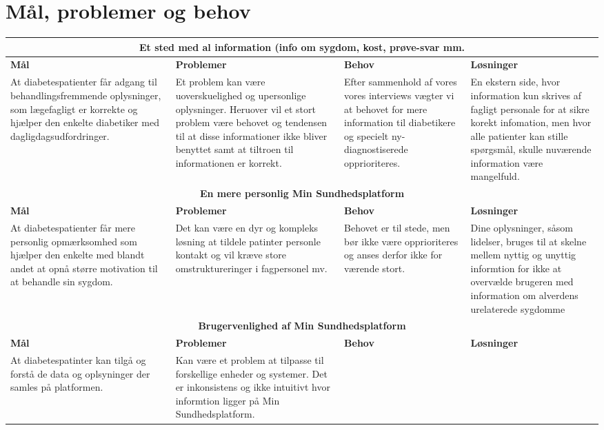 \section{Mål, problemer og behov}
\begin{tabularx}{\textwidth}{|X|X|X|X|}
	\hline
	\multicolumn{4}{|c|}{\textbf{Et sted med al information (info om sygdom, kost, prøve-svar mm.}}\\
	\hline
	\textbf{Mål} & \textbf{Problemer} & \textbf{Behov} & \textbf{Løsninger}\\
	\hline
	At diabetespatienter får adgang til behandlingsfremmende oplysninger, som lægefagligt er korrekte og hjælper den enkelte diabetiker med dagligdagsudfordringer.&
	Et problem kan være uoverskuelighed og upersonlige oplysninger. Heruover vil et stort problem være behovet og tendensen til at disse informationer ikke bliver benyttet samt at tiltroen til informationen er korrekt.&
	Efter sammenhold af vores vores interviews vægter vi at behovet for mere information til diabetikere og specielt ny-diagnostiserede opprioriteres.&
	En ekstern side, hvor information kun skrives af fagligt personale for at sikre korekt infomation, men hvor alle patienter kan stille spørgsmål, skulle nuværende information være mangelfuld.\\
	\hline
	\multicolumn{4}{|c|}{\textbf{En mere personlig Min Sundhedsplatform}}\\
	\hline
	\textbf{Mål} & \textbf{Problemer} & \textbf{Behov} & \textbf{Løsninger}\\
	\hline
	At diabetespatienter får mere personlig opmærksomhed som hjælper den enkelte med blandt andet at opnå større motivation til at behandle sin sygdom.&
	Det kan være en dyr og kompleks løsning at tildele patinter personle kontakt og vil kræve store omstruktureringer i fagpersonel mv.&
	Behovet er til stede, men bør ikke være opprioriteres og anses derfor ikke for værende stort.&
	Dine oplysninger, såsom lidelser, bruges til at skelne mellem nyttig og unyttig informtion for ikke at overvælde brugeren med information om alverdens urelaterede sygdomme\\
	\hline
	\multicolumn{4}{|c|}{\textbf{Brugervenlighed af Min Sundhedsplatform}}\\
	\hline
	\textbf{Mål} & \textbf{Problemer} & \textbf{Behov} & \textbf{Løsninger}\\
	\hline
	At diabetespatinter kan tilgå og forstå de data og oplsyninger der samles på platformen.&
	Kan være et problem at tilpasse til forskellige enheder og systemer.
	Det er inkonsistens og ikke intuitivt hvor informtion ligger på Min Sundhedsplatform.&

\end{tabularx}
